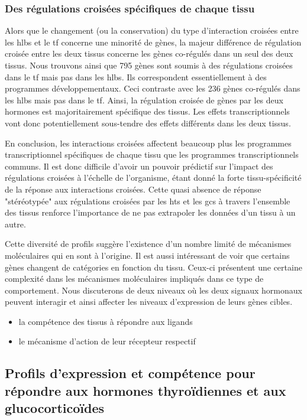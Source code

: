 \documentclass[../main.tex]{subfiles}
\begin{document}
		\subsubsection{Des régulations croisées spécifiques de chaque tissu}
			Alors que le changement (ou la conservation) du type d'interaction croisées entre les \glspl{hlb} et le \gls{tf} concerne une minorité de gènes, la majeur différence de régulation croisée entre les deux tissus concerne les gènes co-régulés dans un seul des deux tissus.
			Nous trouvons ainsi que 795 gènes sont soumis à des régulations croisées dans le \gls{tf} mais pas dans les \glspl{hlb}.
			Ils correspondent essentiellement à des programmes développementaux.
			Ceci contraste avec les 236 gènes co-régulés dans les \glspl{hlb} mais pas dans le \gls{tf}.
			Ainsi, la régulation croisée de gènes par les deux hormones est majoritairement spécifique des tissus.
			Les effets transcriptionnels vont donc potentiellement sous-tendre des effets différents dans les deux tissus.
		\\
		\par
		En conclusion, les interactions croisées affectent beaucoup plus les programmes transcriptionnel spécifiques de chaque tissu que les programmes transcriptionnels communs.
		Il est donc difficile d'avoir un pouvoir prédictif sur l'impact des régulations croisées à l'échelle de l'organisme, étant donné la forte tissu-spécificité de la réponse aux interactions croisées.
		Cette quasi absence de réponse "stéréotypée" aux régulations croisées par les \glspl{ht} et les \glspl{gc} à travers l'ensemble des tissus renforce l'importance de ne pas extrapoler les données d'un tissu à un autre.
		\par
		Cette diversité de profils suggère l'existence d'un nombre limité de mécanismes moléculaires qui en sont à l'origine.
		Il est aussi intéressant de voir que certains gènes changent de catégories en fonction du tissu.
		Ceux-ci présentent une certaine complexité dans les mécanismes moléculaires impliqués dans ce type de comportement.
		Nous discuterons de deux niveaux où les deux signaux hormonaux peuvent interagir et ainsi affecter les niveaux d'expression de leurs gènes cibles.
		\begin{itemize}
			\item
				la compétence des tissus à répondre aux ligands
			\item
				le mécanisme d'action de leur récepteur respectif
		\end{itemize}

	\subsection{Profils d'expression et compétence pour répondre aux hormones thyroïdiennes et aux glucocorticoïdes}
\end{document}
